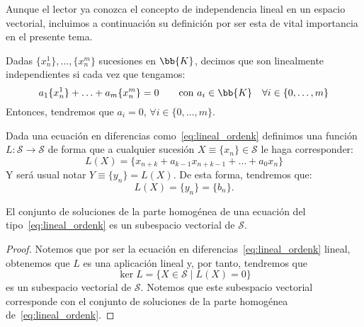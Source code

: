 Aunque el lector ya conozca el concepto de independencia lineal en un espacio vectorial, incluimos a continuación su definición por ser esta de vital importancia en el presente tema.
\begin{definicion}
    Dadas $\{x_n^1\}, \ldots, \{x_n^m\}$ sucesiones en $\bb{K}$, decimos que son linealmente independientes si cada vez que tengamos:
    \begin{equation*}
        a_1 \{x_n^1\} + \ldots + a_m \{x_n^m\} = 0\qquad \text{con\ } a_i\in \bb{K}\quad \forall i \in \{0, \ldots, m\}
    \end{equation*}
    Entonces, tendremos que $a_i = 0$, $\forall i\in \{0, \ldots, m\}$.
\end{definicion}

\begin{definicion}\label{def:FuncF}
    Dada una ecuación en diferencias como~\ref{eq:lineal_ordenk}  definimos una función $L:\mathcal{S}\rightarrow \mathcal{S}$ de forma que a cualquier sucesión $X\equiv \{x_n\} \in \mathcal{S}$ le haga corresponder:
    \begin{equation*}
        L(X) = \{ x_{n+k} + a_{k-1}x_{n+k-1} + \ldots + a_0 x_n \}
    \end{equation*}
    Y será usual notar $Y\equiv \{y_n\} = L(X)$. De esta forma, tendremos que: $$L(X) = \{y_n\} = \{b_n\}.$$
\end{definicion}

\begin{prop}
    El conjunto de soluciones de la parte homogénea de una ecuación del tipo~\ref{eq:lineal_ordenk} es un subespacio vectorial de $\mathcal{S}$.
\end{prop}
\begin{proof}
    Notemos que por ser la ecuación en diferencias~\ref{eq:lineal_ordenk} lineal, obtenemos que $L$ es una aplicación lineal y, por tanto, tendremos que 
    \begin{equation*}
        \ker L = \{X\in \mathcal{S} \mid L(X) = 0\}
    \end{equation*}
    es un subespacio vectorial de $\mathcal{S}$. Notemos que este subespacio vectorial corresponde con el conjunto de soluciones de la parte homogénea de~\ref{eq:lineal_ordenk}.
\end{proof}

